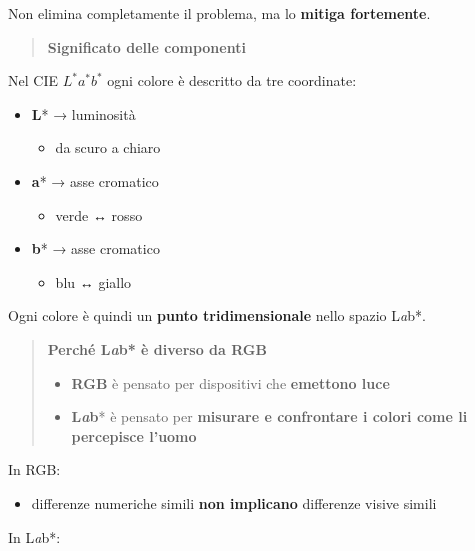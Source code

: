 \documentclass[
]{article}
\providecommand{\tightlist}{%
  \setlength{\itemsep}{0pt}\setlength{\parskip}{0pt}}
\begin{document}
Non elimina completamente il problema, ma lo \textbf{mitiga fortemente}.

\begin{quote}
\textbf{Significato delle componenti}
\end{quote}

Nel CIE \(L^* a^* b^*\) ogni colore è descritto da tre coordinate:

\begin{itemize}
\tightlist
\item
  \textbf{L}* → luminosità

  \begin{itemize}
  \tightlist
  \item
    da scuro a chiaro
  \end{itemize}
\item
  \textbf{a}* → asse cromatico

  \begin{itemize}
  \tightlist
  \item
    verde ↔ rosso
  \end{itemize}
\item
  \textbf{b}* → asse cromatico

  \begin{itemize}
  \tightlist
  \item
    blu ↔ giallo
  \end{itemize}
\end{itemize}

Ogni colore è quindi un \textbf{punto tridimensionale} nello spazio L\emph{a}b*.

\begin{quote}
\textbf{Perché L\emph{a}b* è diverso da RGB}

\begin{itemize}
\tightlist
\item
  \textbf{RGB} è pensato per dispositivi che \textbf{emettono luce}
\item
  \textbf{L\emph{a}b}* è pensato per \textbf{misurare e confrontare i colori come li percepisce l'uomo}
\end{itemize}
\end{quote}

In RGB:

\begin{itemize}
\tightlist
\item
  differenze numeriche simili \textbf{non implicano} differenze visive simili
\end{itemize}

In L\emph{a}b*:
\end{document}
